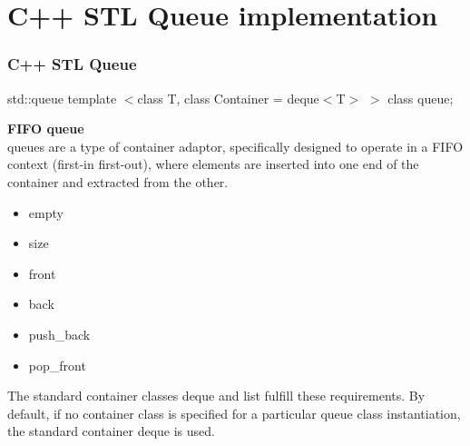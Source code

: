 \documentclass{beamer}
\begin{document}
\section{C++ STL Queue implementation} 

\begin{frame}
\frametitle{C++ STL Queue}

\begin{block}{std::queue}
template $<$class T, class Container = deque$<$T$>$ $>$ class queue;
\end{block}

\textbf{FIFO queue}\\
queues are a type of container adaptor, specifically designed to operate in a FIFO context (first-in first-out), where elements are inserted into one end of the container and extracted from the other.

\begin{multicols}{2}
\begin{itemize}
	\item empty
	\item size
	\item front
	\item back
	\item push\_back
	\item pop\_front
\end{itemize}
\end{multicols}

The standard container classes deque and list fulfill these requirements. By default, if no container class is specified for a particular queue class instantiation, the standard container deque is used.

\end{frame}
\end{document}
